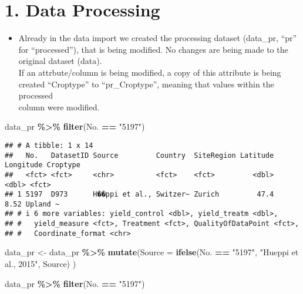 \documentclass[
]{article}
\newenvironment{Shaded}{\begin{snugshade}}{\end{snugshade}}
\newcommand{\AttributeTok}[1]{\textcolor[rgb]{0.13,0.29,0.53}{#1}}
\newcommand{\FunctionTok}[1]{\textcolor[rgb]{0.13,0.29,0.53}{\textbf{#1}}}
\newcommand{\NormalTok}[1]{#1}
\newcommand{\OtherTok}[1]{\textcolor[rgb]{0.56,0.35,0.01}{#1}}
\newcommand{\SpecialCharTok}[1]{\textcolor[rgb]{0.81,0.36,0.00}{\textbf{#1}}}
\newcommand{\StringTok}[1]{\textcolor[rgb]{0.31,0.60,0.02}{#1}}
\providecommand{\tightlist}{%
  \setlength{\itemsep}{0pt}\setlength{\parskip}{0pt}}
\begin{document}
\section{1. Data Processing}\label{data-processing}

\begin{itemize}
\tightlist
\item
  Already in the data import we created the processing dataset
  (data\_pr, ``pr'' for ``processed''), that is being modified. No
  changes are being made to the original dataset (data).\\
  If an attrbute/column is being modified, a copy of this attribute is
  being\\
  created ``Croptype'' to ``pr\_Croptype'', meaning that values within
  the processed\\
  column were modified.
\end{itemize}

\begin{Shaded}
\begin{Highlighting}[]
\NormalTok{data\_pr }\SpecialCharTok{\%\textgreater{}\%} 
  \FunctionTok{filter}\NormalTok{(No. }\SpecialCharTok{==} \StringTok{"5197"}\NormalTok{)}
\end{Highlighting}
\end{Shaded}

\begin{verbatim}
## # A tibble: 1 x 14
##   No.   DatasetID Source         Country  SiteRegion Latitude Longitude Croptype
##   <fct> <fct>     <chr>          <fct>    <fct>         <dbl>     <dbl> <fct>   
## 1 5197  D973      H��ppi et al., Switzer~ Zurich         47.4      8.52 Upland ~
## # i 6 more variables: yield_control <dbl>, yield_treatm <dbl>,
## #   yield_measure <fct>, Treatment <fct>, QualityOfDataPoint <fct>,
## #   Coordinate_format <chr>
\end{verbatim}

\begin{Shaded}
\begin{Highlighting}[]
\NormalTok{data\_pr }\OtherTok{\textless{}{-}} 
\NormalTok{data\_pr }\SpecialCharTok{\%\textgreater{}\%} 
  \FunctionTok{mutate}\NormalTok{(}\AttributeTok{Source =} \FunctionTok{ifelse}\NormalTok{(No. }\SpecialCharTok{==} \StringTok{"5197"}\NormalTok{, }\StringTok{"Hueppi et al., 2015"}\NormalTok{, Source) )}

\NormalTok{data\_pr }\SpecialCharTok{\%\textgreater{}\%} 
  \FunctionTok{filter}\NormalTok{(No. }\SpecialCharTok{==} \StringTok{"5197"}\NormalTok{)}
\end{Highlighting}
\end{Shaded}
\end{document}
